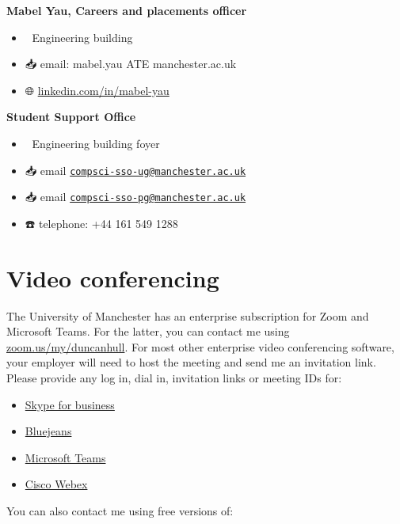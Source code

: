 \documentclass[
  12pt,
]{book}
\providecommand{\tightlist}{%
  \setlength{\itemsep}{0pt}\setlength{\parskip}{0pt}}
\begin{document}
\textbf{Mabel Yau, Careers and placements officer} 👩‍💻

\begin{itemize}
\tightlist
\item
  🏢 Engineering building
\item
  📥 email: mabel.yau ATE manchester.ac.uk
\item
  🌐 \href{https://uk.linkedin.com/in/mabel-yau}{linkedin.com/in/mabel-yau}
\end{itemize}

\textbf{Student Support Office } 👨‍👩‍👧‍👧

\begin{itemize}
\tightlist
\item
  🏢 Engineering building foyer
\item
  📥 email \href{mailto:compsci-sso-ug@manchester.ac.uk}{\nolinkurl{compsci-sso-ug@manchester.ac.uk}}
\item
  📥 email \href{mailto:compsci-sso-pg@manchester.ac.uk}{\nolinkurl{compsci-sso-pg@manchester.ac.uk}}
\item
  ☎️ telephone: +44 161 549 1288
\end{itemize}

\hypertarget{video-conferencing}{%
\section{Video conferencing}\label{video-conferencing}}

The University of Manchester has an enterprise subscription for Zoom and Microsoft Teams. For the latter, you can contact me using \href{https://zoom.us/my/duncanhull}{zoom.us/my/duncanhull}. For most other enterprise video conferencing software, your employer will need to host the meeting and send me an invitation link. Please provide any log in, dial in, invitation links or meeting IDs for:

\begin{itemize}
\tightlist
\item
  \href{https://en.wikipedia.org/wiki/Skype_for_Business}{Skype for business}
\item
  \href{https://en.wikipedia.org/wiki/BlueJeans}{Bluejeans}
\item
  \href{https://en.wikipedia.org/wiki/Microsoft_Teams}{Microsoft Teams}
\item
  \href{https://en.wikipedia.org/wiki/Cisco_Webex}{Cisco Webex}
\end{itemize}

You can also contact me using free versions of:
\end{document}
